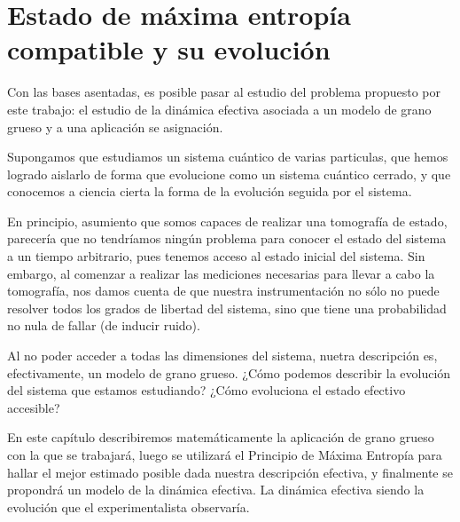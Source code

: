 \chapter{Estado de máxima entropía compatible y su evolución}

Con las bases asentadas, es posible pasar al estudio del problema propuesto por este trabajo: el estudio de la dinámica efectiva asociada a un modelo de grano grueso y a una aplicación se asignación.

Supongamos que estudiamos un sistema cuántico de varias particulas, que hemos logrado aislarlo de forma que evolucione como un sistema cuántico cerrado, y que conocemos a ciencia cierta la forma de la evolución seguida por el sistema.

En principio, asumiento que somos capaces de realizar una tomografía de estado, parecería que no tendríamos ningún problema para conocer el estado del sistema a un tiempo arbitrario, pues tenemos acceso al estado inicial del sistema. Sin embargo, al comenzar a realizar las mediciones necesarias para llevar a cabo la tomografía, nos damos cuenta de que nuestra instrumentación no sólo no puede resolver todos los grados de libertad del sistema, sino que tiene una probabilidad no nula de fallar (de inducir ruido).

Al no poder acceder a todas las dimensiones del sistema, nuetra descripción es, efectivamente, un modelo de grano grueso. ¿Cómo podemos describir la evolución del sistema que estamos estudiando? ¿Cómo evoluciona el estado efectivo accesible?

En este capítulo describiremos matemáticamente la aplicación de grano grueso con la que se trabajará, luego se utilizará el Principio de Máxima Entropía para hallar el mejor estimado posible dada nuestra descripción efectiva, y finalmente se propondrá un modelo de la dinámica efectiva. La dinámica efectiva siendo la evolución que el experimentalista observaría.






\newpage
